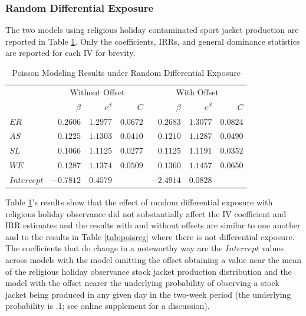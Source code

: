 \documentclass[ShortAfour,times,sageapa]{sagej}
\begin{document}
		\subsubsection{Random Differential Exposure}
		
	The two models using religious holiday contaminated sport jacket production are reported in Table \ref{tab:unexp}.
	Only the coefficients, IRRs, and general dominance statistics are reported for each IV for brevity.
		
	\begin{table}[h!]
		\centering
		\caption{\centering Poisson Modeling Results under Random Differential Exposure}
		\begin{tabular}{l|rrrrrr}
			\toprule
			\multicolumn{1}{l}{} & \multicolumn{3}{c}{Without Offset} & \multicolumn{3}{c}{With Offset} \\ 
			\cmidrule(lr){2-4} \cmidrule(lr){5-7}
			\multicolumn{1}{l}{} & $\beta$ & $e^{\beta}$ & $C$ & $\beta$ & $e^{\beta}$ & $C$ \\ 
			\midrule
			$ER$ & $0.2606$ & $1.2977$ & $0.0672$ & $0.2683$ & $1.3077$ & $0.0824$ \\ 
			$AS$ & $0.1225$ & $1.1303$ & $0.0410$ & $0.1210$ & $1.1287$ & $0.0490$ \\ 
			$SL$ & $0.1066$ & $1.1125$ & $0.0277$ & $0.1125$ & $1.1191$ & $0.0352$ \\  
			$WE$ & $0.1287$ & $1.1374$ & $0.0509$ & $0.1360$ & $1.1457$ & $0.0650$ \\ 
			$Intercept$ & $-0.7812$ & $0.4579$ & & $-2.4914$ & $0.0828$ & \\ 
			\bottomrule
		\end{tabular}
	\label{tab:unexp}
	\end{table}
	
	Table \ref{tab:unexp}'s results show that the effect of random differential exposure with religious holiday observance did not substantially affect the IV coefficient and IRR estimates and the results with and without offsets are similar to one another and to the results in Table \ref{tab:poisreg} where there is not differential exposure.
	The coefficients that do change in a noteworthy way are the $Intercept$ values across models with the model omitting the offset obtaining a value near the mean of the religious holiday observance stock jacket production distribution and the model with the offset nearer the underlying probability of observing a stock jacket being produced in any given day in the two-week period (the underlying probability is .1; see online supplement for a discussion).
	
\end{document}
